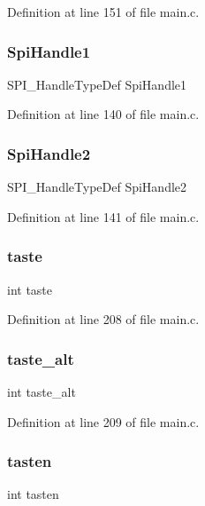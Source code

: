 Definition at line 151 of file main.\+c.

\mbox{\label{main_8c_a00c9bb7caf400d7e17a56521e9d75c85}} 
\subsubsection{Spi\+Handle1}
{\footnotesize\ttfamily S\+P\+I\+\_\+\+Handle\+Type\+Def Spi\+Handle1}



Definition at line 140 of file main.\+c.

\mbox{\label{main_8c_a463271663b0c48dbfd9aa99e871a726a}} 
\subsubsection{Spi\+Handle2}
{\footnotesize\ttfamily S\+P\+I\+\_\+\+Handle\+Type\+Def Spi\+Handle2}



Definition at line 141 of file main.\+c.

\mbox{\label{main_8c_ac65f474d6e726cc95997b61b7943fe59}} 
\subsubsection{taste}
{\footnotesize\ttfamily int taste}



Definition at line 208 of file main.\+c.

\mbox{\label{main_8c_aa7caea948aeb61f46f72c8062e4f8623}} 
\subsubsection{taste\+\_\+alt}
{\footnotesize\ttfamily int taste\+\_\+alt}



Definition at line 209 of file main.\+c.

\mbox{\label{main_8c_a00bbc97133a4f3f4b6a66694962828e4}} 
\subsubsection{tasten}
{\footnotesize\ttfamily int tasten}



